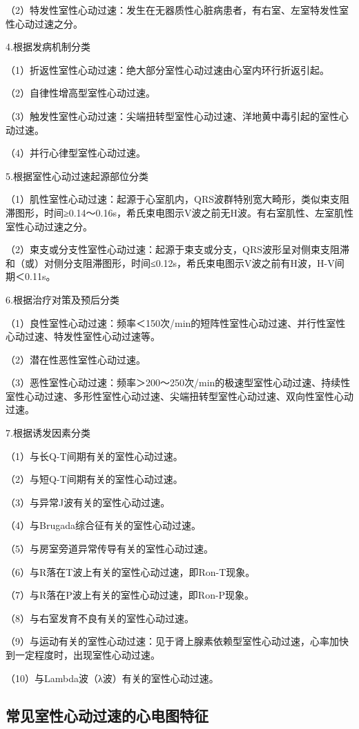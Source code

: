 （2）特发性室性心动过速：发生在无器质性心脏病患者，有右室、左室特发性室性心动过速之分。

4.根据发病机制分类

（1）折返性室性心动过速：绝大部分室性心动过速由心室内环行折返引起。

（2）自律性增高型室性心动过速。

（3）触发性室性心动过速：尖端扭转型室性心动过速、洋地黄中毒引起的室性心动过速。

（4）并行心律型室性心动过速。

5.根据室性心动过速起源部位分类

（1）肌性室性心动过速：起源于心室肌内，QRS波群特别宽大畸形，类似束支阻滞图形，时间≥0.14～0.16s，希氏束电图示V波之前无H波。有右室肌性、左室肌性室性心动过速之分。

（2）束支或分支性室性心动过速：起源于束支或分支，QRS波形呈对侧束支阻滞和（或）对侧分支阻滞图形，时间≤0.12s，希氏束电图示V波之前有H波，H-V间期＜0.11s。

6.根据治疗对策及预后分类

（1）良性室性心动过速：频率＜150次/min的短阵性室性心动过速、并行性室性心动过速、特发性室性心动过速等。

（2）潜在性恶性室性心动过速。

（3）恶性室性心动过速：频率＞200～250次/min的极速型室性心动过速、持续性室性心动过速、多形性室性心动过速、尖端扭转型室性心动过速、双向性室性心动过速。

7.根据诱发因素分类

（1）与长Q-T间期有关的室性心动过速。

（2）与短Q-T间期有关的室性心动过速。

（3）与异常J波有关的室性心动过速。

（4）与Brugada综合征有关的室性心动过速。

（5）与房室旁道异常传导有关的室性心动过速。

（6）与R落在T波上有关的室性心动过速，即Ron-T现象。

（7）与R落在P波上有关的室性心动过速，即Ron-P现象。

（8）与右室发育不良有关的室性心动过速。

（9）与运动有关的室性心动过速：见于肾上腺素依赖型室性心动过速，心率加快到一定程度时，出现室性心动过速。

（10）与Lambda波（λ波）有关的室性心动过速。

\protect\hypertarget{text00040.htmlux5cux23subid446}{}{}

\subsection{常见室性心动过速的心电图特征}

